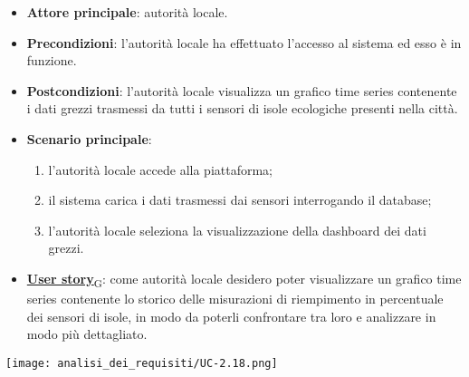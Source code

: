\begin{itemize}
	\item \textbf{Attore principale}: autorità locale.
	\item \textbf{Precondizioni}: l'autorità locale ha effettuato l'accesso al sistema ed esso è in funzione.
	\item \textbf{Postcondizioni}: l'autorità locale visualizza un grafico time series contenente i dati grezzi trasmessi da tutti i sensori
	      di isole ecologiche presenti nella città.
	\item \textbf{Scenario principale}:
	      \begin{enumerate}
		      \item l'autorità locale accede alla piattaforma;
		      \item il sistema carica i dati trasmessi dai sensori interrogando il database;
		      \item l'autorità locale seleziona la visualizzazione della dashboard dei dati grezzi.
	      \end{enumerate}
	\item \href{https://7last.github.io/docs/pb/documentazione-interna/glossario\#user-story}{\textbf{User story}\textsubscript{G}}:
	      come autorità locale desidero poter visualizzare un grafico time series contenente lo storico delle misurazioni di riempimento in percentuale
	      dei sensori di isole, in modo da poterli confrontare tra loro e analizzare in modo più dettagliato.
\end{itemize}
\begin{center}
	\texttt{[image: analisi\_dei\_requisiti/UC-2.18.png]}
\end{center}


